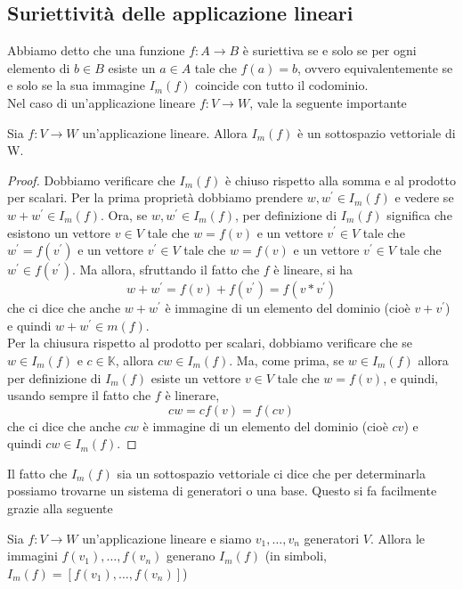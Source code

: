 \subsection{Suriettività delle applicazione lineari}
Abbiamo detto che una funzione $f: A\to B$ è suriettiva se e solo se per ogni elemento di
$b\in B$ esiste un $a\in A$ tale che $f(a)=b$, ovvero equivalentemente se e solo se la sua
immagine $I_m(f)$ coincide con tutto il codominio.\\
Nel caso di un'applicazione lineare $f:V\to W$, vale la seguente importante
\begin{proposizione}
  Sia $f: V\to W$ un'applicazione lineare. Allora $I_m(f)$ è un sottospazio vettoriale di W.
\end{proposizione}
\begin{proof}
  Dobbiamo verificare che $I_m(f)$ è chiuso rispetto alla somma e al prodotto per scalari. Per la
  prima proprietà dobbiamo prendere $w,w^\prime\in I_m(f)$ e vedere se $w+w^\prime\in I_m(f)$. Ora,
  se $w,w^\prime\in I_m(f)$, per definizione di $I_m(f)$ significa che esistono un vettore
  $v\in V$ tale che $w=f(v)$ e un vettore $v^\prime\in V$ tale che $w^\prime=f(v^\prime)$ e un
  vettore $v^\prime\in V$ tale che $w=f(v)$ e un vettore $v^\prime \in V$ tale che
  $w^\prime\in f(v^\prime)$. Ma allora, sfruttando il fatto che $f$ è lineare, si ha
  \begin{equation*}
    w+w^\prime=f(v)+f(v^\prime)=f(v*v^\prime)
  \end{equation*}
  che ci dice che anche $w+w^\prime$ è immagine di un elemento del dominio (cioè $v+v^\prime$) e
  quindi $w+w^\prime\in m(f)$.\\
  Per la chiusura rispetto al prodotto per scalari, dobbiamo verificare che se $w\in I_m(f)$ e
  $c\in\mathds{K}$, allora $cw\in I_m(f)$. Ma, come prima, se $w\in I_m(f)$ allora per
  definizione di $I_m(f)$ esiste un vettore $v\in V$ tale che $w=f(v)$, e quindi, usando sempre
  il fatto che $f$ è linerare,
  \begin{equation*}
    cw=cf(v)=f(cv)
  \end{equation*}
  che ci dice che anche $cw$ è immagine di un elemento del dominio (cioè $cv$) e quindi $cw\in I_m(f)$.
\end{proof}
Il fatto che $I_m(f)$ sia un sottospazio vettoriale ci dice che per determinarla possiamo trovarne un sistema di
generatori o una base. Questo si fa facilmente grazie alla seguente
\begin{proposizione}
  Sia $f:V\to W$ un'applicazione lineare e siamo $v_1,\dots,v_n$ generatori $V$.
  Allora le immagini $f(v_1),\dots,f(v_n)$ generano $I_m(f)$ (in simboli, $I_m(f)=[f(v_1),\dots,f(v_n)]$)
\end{proposizione}
